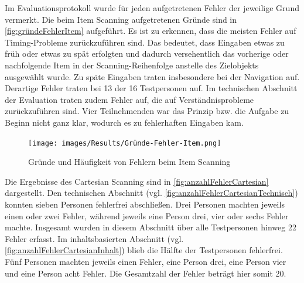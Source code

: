Im Evaluationsprotokoll wurde für jeden aufgetretenen Fehler der jeweilige Grund vermerkt. Die beim Item Scanning aufgetretenen Gründe sind in \autoref{fig:gründeFehlerItem} aufgeführt. Es ist zu erkennen, dass die meisten Fehler auf Timing-Probleme zurückzuführen sind. Das bedeutet, dass Eingaben etwas zu früh oder etwas zu spät erfolgten und dadurch versehentlich das vorherige oder nachfolgende Item in der Scanning-Reihenfolge anstelle des Zielobjekts ausgewählt wurde. Zu späte Eingaben traten insbesondere bei der Navigation auf. Derartige Fehler traten bei 13 der 16 Testpersonen auf. Im technischen Abschnitt der Evaluation traten zudem Fehler auf, die auf Verständnisprobleme zurückzuführen sind. Vier Teilnehmenden war das Prinzip bzw. die Aufgabe zu Beginn nicht ganz klar, wodurch es zu fehlerhaften Eingaben kam. 

\begin{figure}[tbh]
    \centering
    \texttt{[image: images/Results/Gründe-Fehler-Item.png]}
    \caption{Gründe und Häufigkeit von Fehlern beim Item Scanning}
    \label{fig:gründeFehlerItem}
\end{figure}

Die Ergebnisse des Cartesian Scanning sind in \autoref{fig:anzahlFehlerCartesian} dargestellt.
Den technischen Abschnitt (vgl. \autoref{fig:anzahlFehlerCartesianTechnisch}) konnten sieben Personen fehlerfrei abschließen. Drei Personen machten jeweils einen oder zwei Fehler, während jeweils eine Person drei, vier oder sechs Fehler machte. Insgesamt wurden in diesem Abschnitt über alle Testpersonen hinweg 22 Fehler erfasst. 
Im inhaltsbasierten Abschnitt (vgl. \autoref{fig:anzahlFehlerCartesianInhalt}) blieb die Hälfte der Testpersonen fehlerfrei. Fünf Personen machten jeweils einen Fehler, eine Person drei, eine Person vier und eine Person acht Fehler. Die Gesamtzahl der Fehler beträgt hier somit 20.

